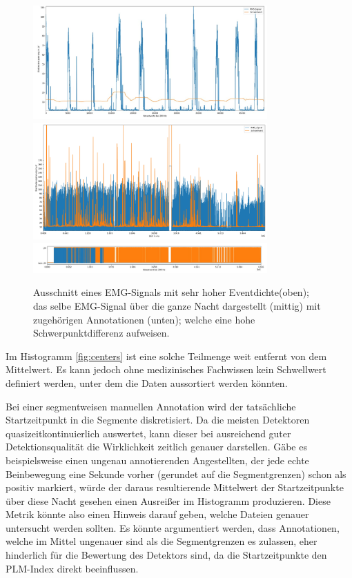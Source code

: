 \begin{figure}[!ht]%
	\begin{center}
	\includegraphics[width=0.80\textwidth]{./Bilder/starkesRauschenzoomedEMGacq_424517352.edf0,6516000.jpg}
	\includegraphics[width=0.80\textwidth]{./Bilder/starkesRauschenEMGacq_424517352.edf0,6516000.jpg}	\includegraphics[width=0.80\textwidth]{./Bilder/starkesRauschen2acq_424517352.edf0,6516000.jpg}
	\end{center}
	\caption{Ausschnitt eines EMG-Signals mit sehr hoher Eventdichte(oben); das selbe EMG-Signal über die ganze Nacht dargestellt (mittig) mit zugehörigen Annotationen (unten); welche eine hohe Schwerpunktdifferenz aufweisen.}%
	\label{fig:noisy}%
\end{figure}


Im Histogramm \ref{fig:centers} ist eine solche Teilmenge weit entfernt von dem Mittelwert. Es kann jedoch ohne medizinisches Fachwissen kein Schwellwert definiert werden, unter dem die Daten aussortiert werden könnten. 


Bei einer segmentweisen manuellen Annotation wird der tatsächliche Startzeitpunkt in die Segmente diskretisiert. Da die meisten Detektoren quasizeitkontinuierlich auswertet, kann dieser bei ausreichend guter Detektionsqualität die Wirklichkeit zeitlich genauer darstellen. 
Gäbe es beispielsweise einen ungenau annotierenden Angestellten, der jede echte Beinbewegung eine Sekunde vorher (gerundet auf die Segmentgrenzen) schon als positiv markiert, würde der daraus resultierende Mittelwert der Startzeitpunkte über diese Nacht gesehen einen Ausreißer im Histogramm produzieren.
Diese Metrik könnte also einen Hinweis darauf geben, welche Dateien genauer untersucht werden sollten.
Es könnte argumentiert werden, dass Annotationen, welche im Mittel ungenauer sind als die Segmentgrenzen es zulassen, eher hinderlich für die Bewertung des Detektors sind, da die Startzeitpunkte den PLM-Index direkt beeinflussen.


